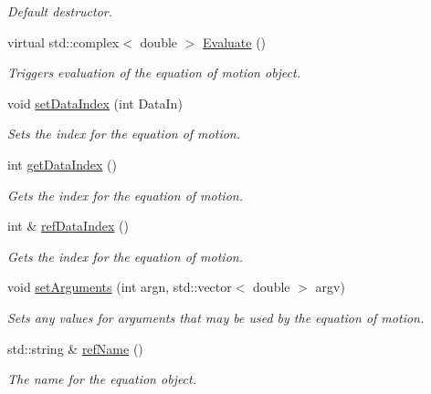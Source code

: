 \begin{DoxyCompactItemize}
\begin{DoxyCompactList}\small\item\em Default destructor. \end{DoxyCompactList}\item 
virtual std\-::complex$<$ double $>$ \hyperlink{classosea_1_1ofreq_1_1_equationof_motion_a7198b4661f6c0a4c1f280863228bd63c}{Evaluate} ()
\begin{DoxyCompactList}\small\item\em Triggers evaluation of the equation of motion object. \end{DoxyCompactList}\item 
void \hyperlink{classosea_1_1ofreq_1_1_equationof_motion_a5a8674f3d8715973fa0affc162ae677c}{set\-Data\-Index} (int Data\-In)
\begin{DoxyCompactList}\small\item\em Sets the index for the equation of motion. \end{DoxyCompactList}\item 
int \hyperlink{classosea_1_1ofreq_1_1_equationof_motion_a45052d6a9814ffa899d1824f5d8e8cee}{get\-Data\-Index} ()
\begin{DoxyCompactList}\small\item\em Gets the index for the equation of motion. \end{DoxyCompactList}\item 
int \& \hyperlink{classosea_1_1ofreq_1_1_equationof_motion_ae16051cbf725210aa44941d41d8800e2}{ref\-Data\-Index} ()
\begin{DoxyCompactList}\small\item\em Gets the index for the equation of motion. \end{DoxyCompactList}\item 
void \hyperlink{classosea_1_1ofreq_1_1_equationof_motion_a154640d80a23348fa9183b6c4ebe3f37}{set\-Arguments} (int argn, std\-::vector$<$ double $>$ argv)
\begin{DoxyCompactList}\small\item\em Sets any values for arguments that may be used by the equation of motion. \end{DoxyCompactList}\item 
std\-::string \& \hyperlink{classosea_1_1ofreq_1_1_equationof_motion_abb7b1a4295e8406ea4f155b1f03689f6}{ref\-Name} ()
\begin{DoxyCompactList}\small\item\em The name for the equation object. \end{DoxyCompactList}\item 

\end{DoxyCompactItemize}
